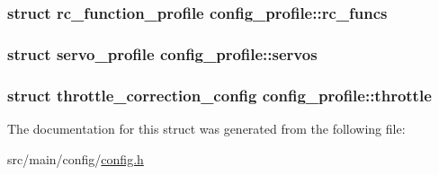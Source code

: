 \hypertarget{structconfig__profile_ad1ec96d23173b9a5fe492dde314e512c}{
\subsubsection[{rc\+\_\+funcs}]{\setlength{\rightskip}{0pt plus 5cm}struct {\bf rc\+\_\+function\+\_\+profile} config\+\_\+profile\+::rc\+\_\+funcs}}\label{structconfig__profile_ad1ec96d23173b9a5fe492dde314e512c}
\hypertarget{structconfig__profile_a6e23e383ad0d15bba87c80f90f64ff76}{
\subsubsection[{servos}]{\setlength{\rightskip}{0pt plus 5cm}struct {\bf servo\+\_\+profile} config\+\_\+profile\+::servos}}\label{structconfig__profile_a6e23e383ad0d15bba87c80f90f64ff76}
\hypertarget{structconfig__profile_a36d1e9f52f01cf6ce3ad5805449e487b}{
\subsubsection[{throttle}]{\setlength{\rightskip}{0pt plus 5cm}struct {\bf throttle\+\_\+correction\+\_\+config} config\+\_\+profile\+::throttle}}\label{structconfig__profile_a36d1e9f52f01cf6ce3ad5805449e487b}


The documentation for this struct was generated from the following file\+:\begin{DoxyCompactItemize}
\item 
src/main/config/\hyperlink{config_8h}{config.\+h}\end{DoxyCompactItemize}
